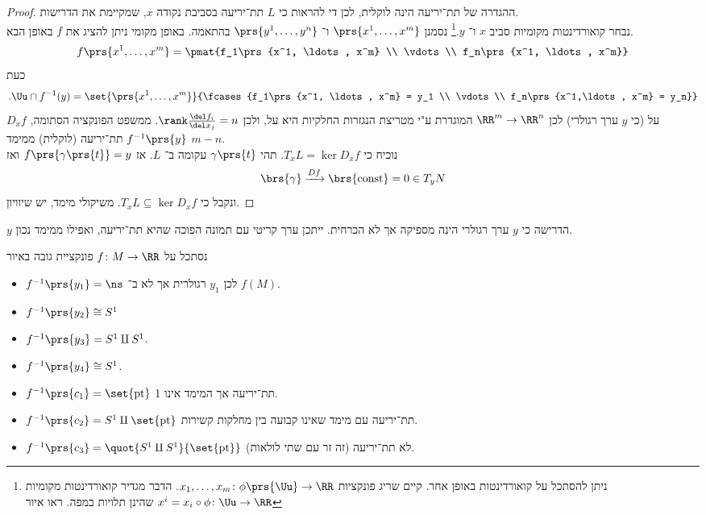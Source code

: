 \documentclass[a4paper,10pt,twoside,openany]{book}
\begin{document}
\begin{proof}
ההגדרה של תת־יריעה הינה לוקלית, לכן די להראות כי
$L$
תת־יריעה בסביבת נקודה
$x$,
שמקיימת את הדרישות.\\
נבחר קואורדינטות מקומיות סביב
$x$
ו־%
$y$.\footnote{ניתן להסתכל על קואורדינטות באופן אחר. קיים שריג פונקציות
$x_1, \ldots, x_m \colon \phi\prs{\Uu} \to \RR$. הדבר מגדיר קואורדינטות מקומיות
$x^i = x_i \circ \phi \colon \Uu \to \RR$
שהינן תלויות במפה. ראו איור
}
נסמנן
$\prs{x^1, \ldots, x^m}$
ו־%
$\prs{y^1, \ldots, y^n}$
בהתאמה.
באופן מקומי ניתן להציג את
$f$
באופן הבא.
\[f\prs{x^1, \ldots, x^m} = \pmat{f_1\prs{x^1, \ldots, x^m} \\ \vdots \\ f_n\prs{x^1, \ldots, x^m}}\]
כעת
\[\text{.} \Uu \cap f^{-1}(y) = \set{\prs{x^1, \ldots, x^m}}{\fcases{f_1\prs{x^1, \ldots, x^m} = y_1 \\ \vdots \\ f_n\prs{x^1,\ldots, x^m} = y_n}}\]
$D_x f$
על
(כי
$y$
ערך רגולרי) לכן
$\RR^m \to \RR^n$
המוגדרת ע"י מטריצת הנגזרות החלקיות היא על, ולכן
$\rank \frac{\del f_i}{\del x_j} = n$.
ממשפט הפונקציה הסתומה,
$f^{-1}\prs{y}$
תת־יריעה (לוקלית) ממימד
$m-n$.\\
נוכיח כי
$T_xL = \ker D_x f$.
תהי
$\gamma\prs{t}$
עקומה ב־%
$L$.
אז
$f\prs{\gamma\prs{t}} = y$
ואז
\[\brs{\gamma} \xrightarrow{Df} \brs{\text{const}} = 0 \in T_y N\]
ונקבל כי
$T_x L \subseteq \ker D_x f$.
משיקולי מימד, יש שיוויון.
\end{proof}
\begin{remark}
$y$
הדרישה כי
$y$
ערך רגולרי
הינה מספיקה אך לא הכרחית.
ייתכן ערך קריטי עם תמונה הפוכה שהיא תת־יריעה, ואפילו ממימד נכון.
\end{remark}
\begin{example}
נסתכל על
$f \colon M \to \RR$
פונקציית גובה באיור
\begin{itemize}
\item
$f^{-1}\prs{y_1} = \ns$
לכן
$y_1$
רגולרית אך לא ב־%
$f(M)$.
\item
$f^{-1}\prs{y_2} \cong S^1$
\item $f^{-1}\prs{y_3} = S^1 \amalg S^1$.
\item $f^{-1}\prs{y_4} \cong S^1$.
\item $f^{-1}\prs{c_1} = \set{\text{pt}}$
תת־יריעה אך המימד אינו 1.
\item $f^{-1}\prs{c_2} = S^1 \amalg \set{\text{pt}}$
תת־יריעה עם מימד שאינו קבועה בין מחלקות קשירות.
\item $f^{-1}\prs{c_3} = \quot{S^1 \amalg S^1}{\set{\text{pt}}}$
לא תת־יריעה (זה זר עם שתי לולאות).
\end{itemize}
\end{example}
\end{document}
